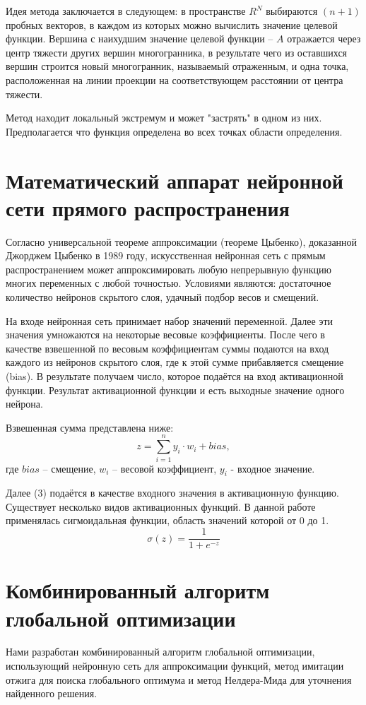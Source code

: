 \documentclass[11pt, oneside, a4paper]{article}
\begin{document}
Идея метода заключается в следующем: в пространстве $R^N$ выбираются $(n+1)$ пробных векторов, в каждом из которых можно вычислить значение целевой функции. Вершина с наихудшим значение целевой функции -- $A$ отражается через центр тяжести других вершин многогранника, в результате чего из оставшихся вершин строится новый многогранник, называемый отраженным, и одна точка, расположенная на линии проекции на соответствующем расстоянии от центра тяжести.

Метод находит локальный экстремум и может "застрять" в одном из них. Предполагается что функция определена во всех точках области определения.

\section{Математический аппарат нейронной сети прямого распространения}
Согласно универсальной теореме аппроксимации (теореме Цыбенко), доказанной Джорджем Цыбенко в 1989 году, искусственная нейронная сеть с прямым распространением может аппроксимировать любую непрерывную функцию многих переменных с любой точностью. Условиями являются: достаточное количество нейронов скрытого слоя, удачный подбор весов и смещений.

На входе нейронная сеть принимает набор значений переменной. Далее эти значения умножаются на некоторые весовые коэффициенты. После чего в качестве взвешенной по весовым коэффициентам суммы подаются  на вход  каждого из нейронов скрытого слоя, где к этой сумме прибавляется смещение (bias). В результате получаем число, которое подаётся на вход активационной функции. Результат активационной функции и есть выходные значение одного нейрона.

Взвешенная сумма представлена ниже:
\begin{equation}
z = \sum_{i=1}^n y_i \cdot w_i +bias,
\end{equation}
где $bias$ – смещение, $w_i$ – весовой коэффициент, $y_i$ - входное значение.

Далее (3) подаётся в качестве входного значения в активационную функцию. Существует несколько видов активационных функций. В данной работе применялась сигмоидальная функции, область значений которой от 0 до 1.
\begin{equation}
\sigma(z)= \frac{1}{1+e^{-z}}
\end{equation}

\section{Комбинированный алгоритм глобальной оптимизации}
Нами разработан комбинированный алгоритм глобальной оптимизации, использующий нейронную сеть для аппроксимации функций, метод имитации отжига для поиска глобального оптимума и метод Нелдера-Мида для уточнения найденного решения. 
\end{document}

